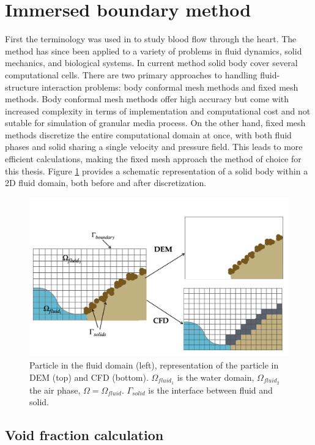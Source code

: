 \section{Immersed boundary method}
First the terminology was used in \cite{peskin1972flow} to study blood flow through the heart. The method has since been applied to a variety of problems in fluid dynamics, solid mechanics, and biological systems. In current method solid body cover several computational cells. There are two primary approaches to handling fluid-structure interaction problems: body conformal mesh methods and fixed mesh methods. Body conformal mesh methods offer high accuracy but come with increased complexity in terms of implementation and computational cost and not sutable for simulation of granular media process. On the other hand, fixed mesh methods discretize the entire computational domain at once, with both fluid phases and solid sharing a single velocity and pressure field. This leads to more efficient calculations, making the fixed mesh approach the method of choice for this thesis. Figure \ref{fig:CFDDEM} provides a schematic representation of a solid body within a 2D fluid domain, both before and after discretization. 
\begin{figure}[!ht]
    \centering
    \includegraphics[width=14cm]{Images/CFD_DEM_scheme.png}
    \caption{Particle in the fluid domain (left), representation of the particle in DEM (top) and CFD (bottom).  $\Omega_{fluid_1}$ is the water domain, $\Omega_{fluid_2}$ the air phase, $\Omega = \Omega_{fluid}$. $\Gamma_{solid}$ is the interface between fluid and solid. 
}
    \label{fig:CFDDEM}
\end{figure}


\subsection{Void fraction calculation}

